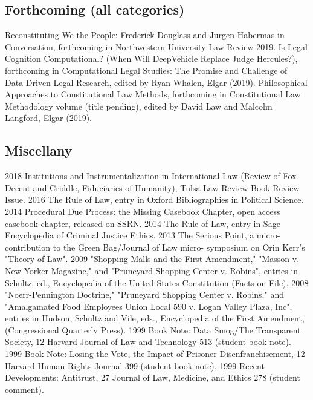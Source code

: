\documentclass[letterpaper]{moderncv}
\begin{document}
\subsection{Forthcoming (all categories)}
\cvitem
{}
{Reconstituting We the People: Frederick Douglass and Jurgen Habermas in Conversation, forthcoming in Northwestern University Law Review 2019.}
\vspace{1mm}
\cvitem
{}
{Is Legal Cognition Computational? (When Will DeepVehicle Replace Judge Hercules?), forthcoming in Computational Legal Studies: The Promise and Challenge of Data-Driven Legal Research, edited by Ryan Whalen, Elgar (2019).}
\vspace{1mm}
\cvitem
{}
{Philosophical Approaches to Constitutional Law Methods, forthcoming in Constitutional Law Methodology volume (title pending), edited by David Law and Malcolm Langford, Elgar (2019).}
\vspace{1mm}

\subsection{Miscellany}
\cvitem
{2018}
{Institutions and Instrumentalization in International Law (Review of Fox-Decent and Criddle, Fiduciaries of Humanity), Tulsa Law Review Book Review Issue.}
\vspace{1mm}
\cvitem
{2016}
{The Rule of Law, entry in Oxford Bibliographies in Political Science.}
\vspace{1mm}
\cvitem
{2014}
{Procedural Due Process: the Missing Casebook Chapter, open access casebook chapter, released on SSRN.}
\vspace{1mm}
\cvitem
{2014}
{The Rule of Law, entry in Sage Encyclopedia of Criminal Justice Ethics.}
\vspace{1mm}
\cvitem
{2013}
{The Serious Point, a micro-contribution to the Green Bag/Journal of Law micro- symposium on Orin Kerr's "Theory of Law".}
\vspace{1mm}
\cvitem
{2009}
{"Shopping Malls and the First Amendment," "Masson v. New Yorker Magazine," and "Pruneyard Shopping Center v. Robins", entries in Schultz, ed., Encyclopedia of the United States Constitution (Facts on File).}
\vspace{1mm}
\cvitem
{2008}
{"Noerr-Pennington Doctrine," "Pruneyard Shopping Center v. Robins," and "Amalgamated Food Employees Union Local 590 v. Logan Valley Plaza, Inc", entries in Hudson, Schultz and Vile, eds., Encyclopedia of the First Amendment, (Congressional Quarterly Press).}
\vspace{1mm}
\cvitem
{1999}
{Book Note: Data Smog/The Transparent Society, 12 Harvard Journal of Law and Technology 513 (student book note).}
\vspace{1mm}
\cvitem
{1999}
{Book Note: Losing the Vote, the Impact of Prisoner Disenfranchisement, 12 Harvard Human Rights Journal 399 (student book note).}
\vspace{1mm}
\cvitem
{1999}
{Recent Developments: Antitrust, 27 Journal of Law, Medicine, and Ethics 278 (student comment).}
\vspace{1mm}
\end{document}
